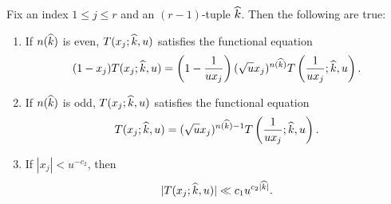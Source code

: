 \documentclass[12pt,reqno,oneside]{amsart}
\begin{document}
    \begin{proposition}\label{prop:T_functional_equations}
        Fix an index $1 \le j \le r$ and an $(r-1)$-tuple $\widehat{k}$. Then the following are true:
        \begin{enumerate}[label=(\roman*)]
            \item If $n(\widehat{k})$ is even, $T(x_{j};\widehat{k},u)$ satisfies the functional equation
            \[
                (1-x_{j})T(x_{j};\widehat{k},u) = \left(1-\frac{1}{ux_{j}}\right)(\sqrt{u}x_{j})^{n(\widehat{k})}T\left(\frac{1}{ux_{j}};\widehat{k},u\right).
            \]
            \item If $n(\widehat{k})$ is odd, $T(x_{j};\widehat{k},u)$ satisfies the functional equation
            \[
                T(x_{j};\widehat{k},u) = (\sqrt{u}x_{j})^{n(\widehat{k})-1}T\left(\frac{1}{ux_{j}};\widehat{k},u\right).
            \]
            \item If $|x_{j}| < u^{-c_{2}}$, then
            \[
                |T(x_{j};\widehat{k},u)| \ll c_{1}u^{c_{2}|\widehat{k}|}.
            \]
        \end{enumerate}
    \end{proposition}
\end{document}
